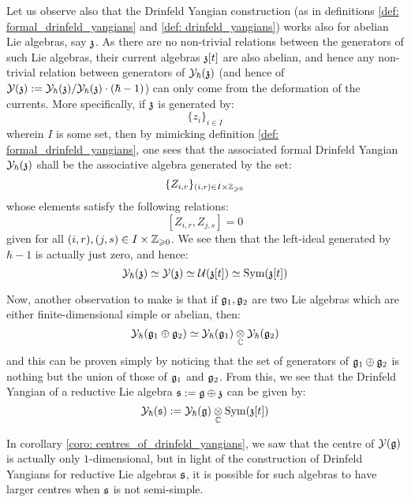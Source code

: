         Let us observe also that the Drinfeld Yangian construction (as in definitions \ref{def: formal_drinfeld_yangians} and \ref{def: drinfeld_yangians}) works also for abelian Lie algebras, say $\mathfrak{z}$. As there are no non-trivial relations between the generators of such Lie algebras, their current algebras $\mathfrak{z}[t]$ are also abelian, and hence any non-trivial relation between generators of $\mathcal{Y}_{\hbar}(\mathfrak{z})$ (and hence of $\mathcal{Y}(\mathfrak{z}) := \mathcal{Y}_{\hbar}(\mathfrak{z})/\mathcal{Y}_{\hbar}(\mathfrak{z}) \cdot (\hbar - 1)$) can only come from the deformation of the currents. More specifically, if $\mathfrak{z}$ is generated by:
            $$\{z_i\}_{i \in I}$$
        wherein $I$ is some set, then by mimicking definition \ref{def: formal_drinfeld_yangians}, one sees that the associated formal Drinfeld Yangian $\mathcal{Y}_{\hbar}(\mathfrak{z})$ shall be the associative algebra generated by the set:
            $$\{Z_{i, r}\}_{(i, r) \in I \x \Z_{\geq 0}}$$
        whose elements satisfy the following relations:
            $$[ Z_{i, r}, Z_{j, s} ] = 0$$
        given for all $(i, r), (j, s) \in I \x \Z_{\geq 0}$. We see then that the left-ideal generated by $\hbar - 1$ is actually just zero, and hence:
            $$\mathcal{Y}_{\hbar}(\mathfrak{z}) \simeq \mathcal{Y}(\mathfrak{z}) \simeq \mathcal{U}(\mathfrak{z}[t]) \simeq \mathrm{Sym}(\mathfrak{z}[t])$$

        Now, another observation to make is that if $\mathfrak{g}_1, \mathfrak{g}_2$ are two Lie algebras which are either finite-dimensional simple or abelian, then:
            $$\calY_{\hbar}(\g_1 \oplus \g_2) \cong \calY_{\hbar}(\g_1) \tensor_{\bbC} \calY_{\hbar}(\g_2)$$
        and this can be proven simply by noticing that the set of generators of $\mathfrak{g}_1 \oplus \mathfrak{g}_2$ is nothing but the union of those of $\mathfrak{g}_1$ and $\mathfrak{g}_2$. From this, we see that the Drinfeld Yangian of a reductive Lie algebra $\mathfrak{s} := \mathfrak{g} \oplus \mathfrak{z}$ can be given by:
            $$\calY_{\hbar}(\s) := \calY_{\hbar}(\g) \tensor_{\bbC} \Sym(\z[t])$$

        In corollary \ref{coro: centres_of_drinfeld_yangians}, we saw that the centre of $\mathcal{Y}(\mathfrak{g})$ is actually only $1$-dimensional, but in light of the construction of Drinfeld Yangians for reductive Lie algebras $\mathfrak{s}$, it is possible for such algebras to have larger centres when $\mathfrak{s}$ is not semi-simple.

